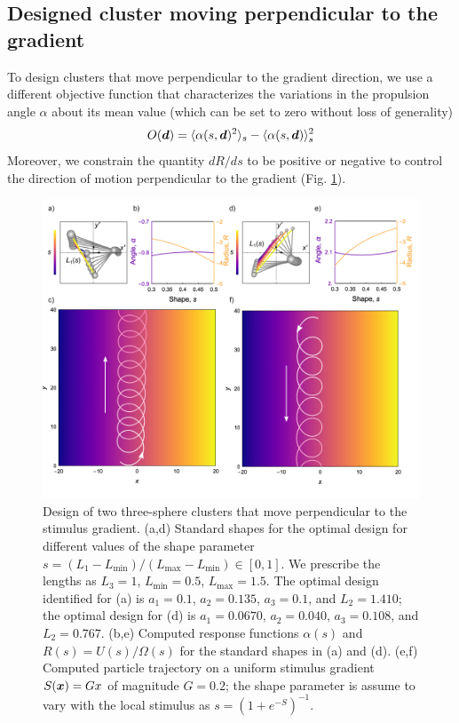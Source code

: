 \begin{appendices}
\clearpage
\section{Designed cluster moving perpendicular to the gradient}

To design clusters that move perpendicular to the gradient direction, we use a different objective function that characterizes the variations in the propulsion angle $\alpha$ about its mean value (which can be set to zero without loss of generality)
\begin{equation}
    O(\boldsymbol{d}) = \langle \alpha(s,\boldsymbol{d})^2 \rangle_s - \langle \alpha(s,\boldsymbol{d}) \rangle^2_s
\end{equation}
Moreover, we constrain the quantity $d R/d s$ to be positive or negative to control the direction of motion perpendicular to the gradient (Fig. \ref{fig:perpChemo}).

\begin{figure}[h]
    \centering
    \includegraphics[width=15cm]{figures/A3_FigureS4.pdf}
    \caption{Design of two three-sphere clusters that move perpendicular to the stimulus gradient. (a,d) Standard shapes for the optimal design for different values of the shape parameter $s=(L_1-L_{\min})/(L_{\max}-L_{\min})\in [0,1]$.
    We prescribe the lengths as $L_3=1$, $L_{\min}=0.5$, $L_{\max}=1.5$. The optimal design identified for (a) is $a_1=0.1$, $a_2=0.135$, $a_3=0.1$, and $L_2=1.410$; the optimal design for (d) is $a_1=0.0670$, $a_2=0.040$, $a_3=0.108$, and $L_2=0.767$. (b,e) Computed response functions $\alpha(s)$ and $R(s)=U(s)/\Omega(s)$ for the standard shapes in (a) and (d). (e,f) Computed particle trajectory on a uniform stimulus gradient $S(\boldsymbol{x})=Gx$ of magnitude $G=0.2$; the shape parameter is assume to vary with the local stimulus as $s = (1+ e^{-S})^{-1}$.}
    \label{fig:perpChemo}
\end{figure}




\end{appendices}
